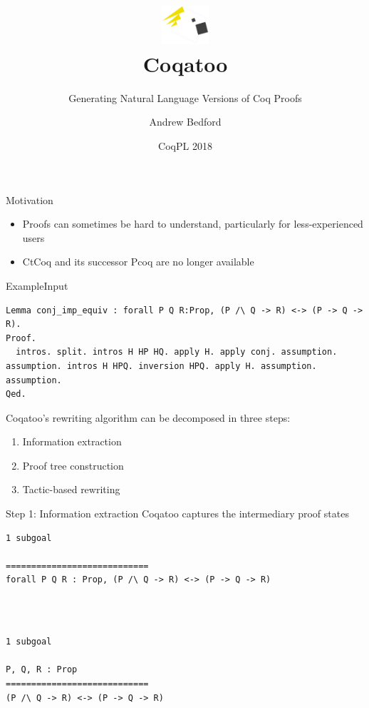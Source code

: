 \documentclass[pdf]{beamer}
\title[Coqatoo]{\includegraphics[width=50pt]{images/logo.png}\\Coqatoo}
\subtitle{Generating Natural Language Versions of Coq Proofs}
\author{Andrew Bedford}
\institute{Laval University}
\date{CoqPL 2018}
\begin{document}
\begin{frame}
    \titlepage
\end{frame}

\begin{frame}{Motivation}
    \begin{itemize}
        \item Proofs can sometimes be hard to understand, particularly for less-experienced users
        \item CtCoq and its successor Pcoq are no longer available
    \end{itemize}
\end{frame}

\begin{frame}[fragile]{Example}{Input}
\begin{adjustbox}{minipage=\linewidth,bgcolor=coqatoo-gray,trim=-3pt 5pt -3pt 5pt}        
\begin{lstlisting}[label=listing:input]
Lemma conj_imp_equiv : forall P Q R:Prop, (P /\ Q -> R) <-> (P -> Q -> R).
Proof.
  intros. split. intros H HP HQ. apply H. apply conj. assumption. assumption. intros H HPQ. inversion HPQ. apply H. assumption. assumption.
Qed.
\end{lstlisting}
\end{adjustbox}
\end{frame}

\begin{frame}
    Coqatoo’s rewriting algorithm can be decomposed in three steps:
    \begin{enumerate}
        \item Information extraction
        \item Proof tree construction
        \item Tactic-based rewriting
    \end{enumerate}
\end{frame}


\begin{frame}[fragile]{Step 1: Information extraction}
Coqatoo captures the intermediary proof states
\begin{adjustbox}{minipage=\linewidth,bgcolor=coqatoo-gray,trim=-3pt 5pt -3pt 5pt}
\begin{lstlisting}[label=listing:before-intros]
1 subgoal

============================
forall P Q R : Prop, (P /\ Q -> R) <-> (P -> Q -> R)
\end{lstlisting}
\end{adjustbox}
~\\~\\
\begin{adjustbox}{minipage=\linewidth,bgcolor=coqatoo-gray,trim=-3pt 5pt -3pt 5pt}
\begin{lstlisting}[label=listing:after-intros]
1 subgoal

P, Q, R : Prop
============================
(P /\ Q -> R) <-> (P -> Q -> R)
\end{lstlisting}
\end{adjustbox}
\end{frame}
\end{document}

